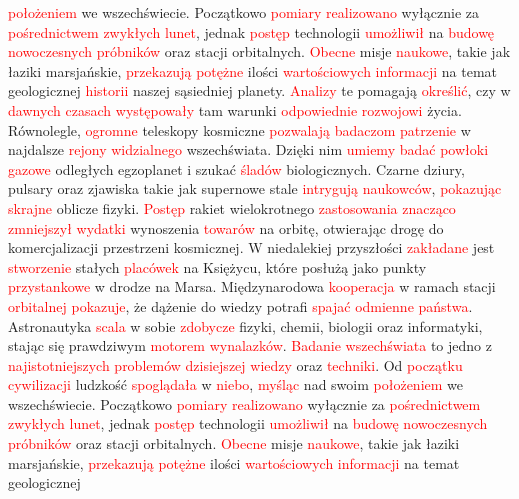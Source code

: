 \documentclass[12pt,a4paper]{article}
\begin{document}
\textcolor{red}{położeniem} we wszechświecie. Początkowo \textcolor{red}{pomiary} \textcolor{red}{realizowano} wyłącznie za \textcolor{red}{pośrednictwem} \textcolor{red}{zwykłych} \textcolor{red}{lunet}, jednak \textcolor{red}{postęp} technologii \textcolor{red}{umożliwił} na \textcolor{red}{budowę} \textcolor{red}{nowoczesnych} \textcolor{red}{próbników} oraz stacji orbitalnych. \textcolor{red}{Obecne} misje \textcolor{red}{naukowe}, takie jak łaziki marsjańskie, \textcolor{red}{przekazują} \textcolor{red}{potężne} ilości \textcolor{red}{wartościowych} \textcolor{red}{informacji} na temat geologicznej \textcolor{red}{historii} naszej sąsiedniej planety. \textcolor{red}{Analizy} te pomagają \textcolor{red}{określić}, czy w \textcolor{red}{dawnych} \textcolor{red}{czasach} \textcolor{red}{występowały} tam warunki \textcolor{red}{odpowiednie} \textcolor{red}{rozwojowi} życia. Równolegle, \textcolor{red}{ogromne} teleskopy kosmiczne \textcolor{red}{pozwalają} \textcolor{red}{badaczom} \textcolor{red}{patrzenie} w najdalsze \textcolor{red}{rejony} \textcolor{red}{widzialnego} wszechświata. Dzięki nim \textcolor{red}{umiemy} \textcolor{red}{badać} \textcolor{red}{powłoki} \textcolor{red}{gazowe} odległych egzoplanet i szukać \textcolor{red}{śladów} biologicznych. Czarne dziury, pulsary oraz zjawiska takie jak supernowe stale \textcolor{red}{intrygują} \textcolor{red}{naukowców}, \textcolor{red}{pokazując} \textcolor{red}{skrajne} oblicze fizyki. \textcolor{red}{Postęp} rakiet wielokrotnego \textcolor{red}{zastosowania} \textcolor{red}{znacząco} \textcolor{red}{zmniejszył} \textcolor{red}{wydatki} wynoszenia \textcolor{red}{towarów} na orbitę, otwierając drogę do komercjalizacji przestrzeni kosmicznej. W niedalekiej przyszłości \textcolor{red}{zakładane} jest \textcolor{red}{stworzenie} stałych \textcolor{red}{placówek} na Księżycu, które posłużą jako punkty \textcolor{red}{przystankowe} w drodze na Marsa. Międzynarodowa \textcolor{red}{kooperacja} w ramach stacji \textcolor{red}{orbitalnej} \textcolor{red}{pokazuje}, że dążenie do wiedzy potrafi \textcolor{red}{spajać} \textcolor{red}{odmienne} \textcolor{red}{państwa}. Astronautyka \textcolor{red}{scala} w sobie \textcolor{red}{zdobycze} fizyki, chemii, biologii oraz informatyki, stając się prawdziwym \textcolor{red}{motorem} \textcolor{red}{wynalazków}. \textcolor{red}{Badanie} \textcolor{red}{wszechświata} to jedno z \textcolor{red}{najistotniejszych} \textcolor{red}{problemów} \textcolor{red}{dzisiejszej} \textcolor{red}{wiedzy} oraz \textcolor{red}{techniki}. Od \textcolor{red}{początku} \textcolor{red}{cywilizacji} ludzkość \textcolor{red}{spoglądała} w \textcolor{red}{niebo}, \textcolor{red}{myśląc} nad swoim \textcolor{red}{położeniem} we wszechświecie. Początkowo \textcolor{red}{pomiary} \textcolor{red}{realizowano} wyłącznie za \textcolor{red}{pośrednictwem} \textcolor{red}{zwykłych} \textcolor{red}{lunet}, jednak \textcolor{red}{postęp} technologii \textcolor{red}{umożliwił} na \textcolor{red}{budowę} \textcolor{red}{nowoczesnych} \textcolor{red}{próbników} oraz stacji orbitalnych. \textcolor{red}{Obecne} misje \textcolor{red}{naukowe}, takie jak łaziki marsjańskie, \textcolor{red}{przekazują} \textcolor{red}{potężne} ilości \textcolor{red}{wartościowych} \textcolor{red}{informacji} na temat geologicznej 
\end{document}
